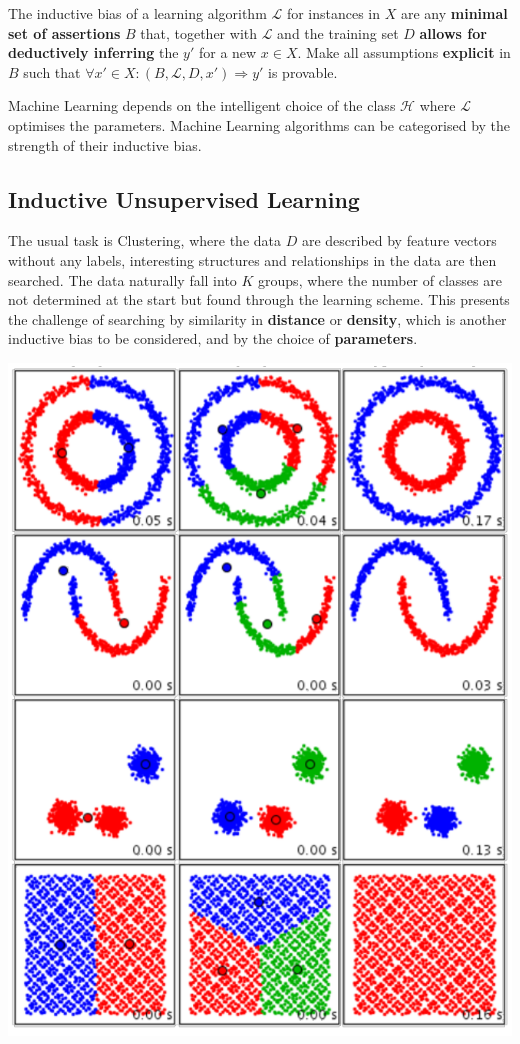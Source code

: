 \documentclass[11pt]{article}
\theoremstyle{definition}
\begin{document}
The inductive bias of a learning algorithm $\mathcal{L}$ for instances in $X$ are any \textbf{minimal set of assertions} $B$ that, together with $\mathcal{L}$ and the training set $D$ \textbf{allows for deductively inferring} the $y'$ for a new $x\in X$. Make all assumptions \textbf{explicit} in $B$ such that $\forall x' \in X: \left(B, \mathcal{L}, D, x' \right) \Rightarrow y'$ is provable.

Machine Learning depends on the intelligent choice of the class $\mathcal{H}$ where $\mathcal{L}$ optimises the parameters. Machine Learning algorithms can be categorised by the strength of their inductive bias.

\subsection{Inductive Unsupervised Learning}
\begin{minipage}{0.6\linewidth}
	The usual task is Clustering, where the data $D$ are described by feature vectors without any labels, interesting structures and relationships in the data are then searched. The data naturally fall into $K$ groups, where the number of classes are not determined at the start but found through the learning scheme. This presents the challenge of searching by similarity in \textbf{distance} or \textbf{density}, which is another inductive bias to be considered, and by the choice of \textbf{parameters}.
	
\end{minipage}
\begin{minipage}{0.4\linewidth}
	\begin{center}
		\includegraphics[width=0.6\linewidth]{img/clustering_example}
	\end{center}
\end{minipage}
\end{document}
